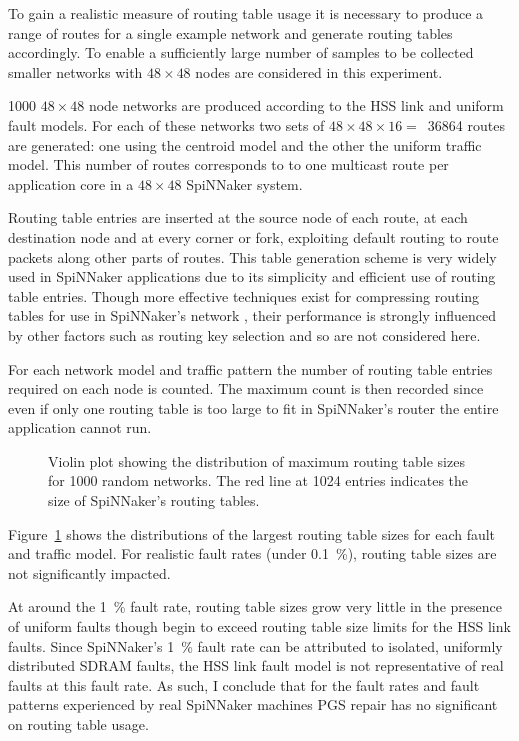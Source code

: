 			To gain a realistic measure of routing table usage it is
			necessary to produce a range of routes for a single example network and
			generate routing tables accordingly.  To enable a sufficiently large
			number of samples to be collected smaller networks with $48\times48$
			nodes are considered in this experiment.
			
			\num{1000} $48\times48$ node networks are produced according to the HSS
			link and uniform fault models. For each of these networks two sets of
			$48\times48\times16=$~\num{36864} routes are generated: one using the
			centroid model and the other the uniform traffic model. This number of
			routes corresponds to to one multicast route per application core in a
			$48\times48$ SpiNNaker system.
			
			Routing table entries are inserted at the source node of each route, at
			each destination node and at every corner or fork, exploiting default
			routing to route packets along other parts of routes. This table
			generation scheme is very widely used in SpiNNaker applications due to
			its simplicity and efficient use of routing table entries. Though more
			effective techniques exist for compressing routing tables for use in
			SpiNNaker's network \cite{mundy16}, their performance is strongly
			influenced by other factors such as routing key selection and so are not
			considered here.
			
			For each network model and traffic pattern the number of routing table
			entries required on each node is counted. The maximum count is then
			recorded since even if only one routing table is too large to fit in
			SpiNNaker's router the entire application cannot run.
			
			\begin{figure}
				\center
				
				\caption{Violin plot showing the distribution of maximum routing table
				sizes for \num{1000} random networks. The red line at \num{1024}
				entries indicates the size of SpiNNaker's routing tables.}
				\label{fig:routing-entries}
			\end{figure}
			
			Figure~\ref{fig:routing-entries} shows the distributions of the largest
			routing table sizes for each fault and traffic model. For realistic fault
			rates (under \SI{0.1}{\percent}), routing table sizes are not
			significantly impacted.
			
			At around the \SI{1}{\percent} fault rate, routing table sizes grow very
			little in the presence of uniform faults though begin to exceed routing
			table size limits for the HSS link faults. Since SpiNNaker's
			\SI{1}{\percent} fault rate can be attributed to isolated, uniformly
			distributed SDRAM faults, the HSS link fault model is not representative
			of real faults at this fault rate. As such, I conclude that for the fault
			rates and fault patterns experienced by real SpiNNaker machines PGS
			repair has no significant on routing table usage.
			
